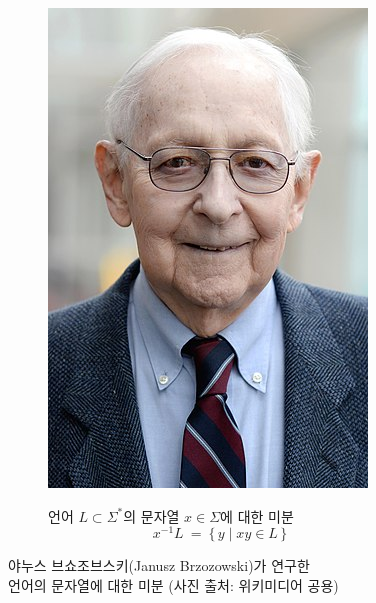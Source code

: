 \documentclass[b5paper,chapter,figtabcapt]{oblivoir}
\newcommand{\VERT}{\ensuremath{\mathop{\!\resizebox{1.65ex}{.7em}{\texttt{|}}\!}}}
\begin{document}
\begin{figure}\centering
\begin{subfigure}{.2\textwidth}
\includegraphics[trim={0 50pt 0 0},clip]{JanuszBrzozowski.jpg}
\end{subfigure}
\begin{subfigure}{.6\textwidth}
언어 $L\subset\Sigma^{*}$의 문자열 $x\in\Sigma$에 대한 미분
\[ x^{-1} L ~=~ \{\,y \mid xy\in L\,\} \]
\end{subfigure}
\caption{야누스 브쇼조브스키(Janusz Brzozowski)가 연구한 \\
         언어의 문자열에 대한 미분
         {\scriptsize(사진 출처: 위키미디어 공용)}
         \label{fig:Brzozowski}}
\end{figure}


\lipsum[1]
\end{document}
